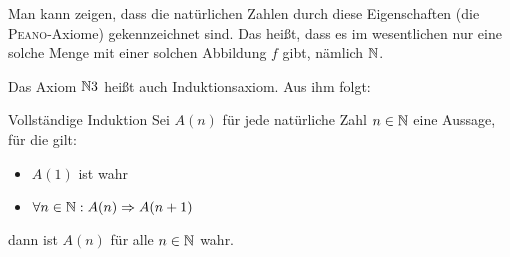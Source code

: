 Man kann zeigen, dass die natürlichen Zahlen durch diese Eigenschaften (die \textsc{Peano}-Axiome) gekennzeichnet sind. Das heißt, dass es im wesentlichen nur eine solche Menge mit einer solchen Abbildung $f$ gibt, nämlich $\mathbb{N}$.

Das Axiom $\mathbb{N} 3$ heißt auch Induktionsaxiom. Aus ihm folgt:

\begin{satz}{Vollständige Induktion}
  Sei $A(n)$ für jede natürliche Zahl $n \in\mathbb{N}$ eine Aussage, für die gilt:
  \begin{itemize}
    \item $A(1)$ ist wahr
    \item $\forall n\in\mathbb{N} : A(n) \Rightarrow A(n+1)$
  \end{itemize}
  dann ist $A(n)$ für alle $n\in\mathbb{N}$ wahr.
\end{satz}
